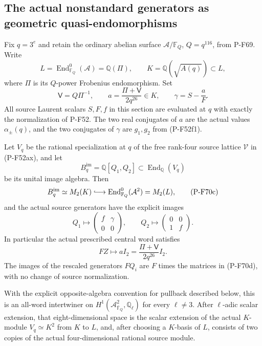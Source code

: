 \subsection{The actual nonstandard generators as geometric quasi-endomorphisms}

\begin{proposition}
\label{prop:nonstandardcorrespondence}
Fix $q=3^e$ and retain the ordinary abelian surface
$\mathcal A/\mathbb F_Q$, $Q=q^{116}$, from P-F69.
Write
\[
 L=\operatorname{End}^0_{\mathbb F_Q}(\mathcal A)
      =\mathbb Q(\Pi),\qquad
 K=\mathbb Q(\sqrt{A(q)})\subset L,
\]
where $\Pi$ is its $Q$-power Frobenius endomorphism.
Set
\[
 \mathsf V=Q\Pi^{-1},\qquad
 a=\frac{\Pi+\mathsf V}{2q^{26}}\in K,\qquad
 \gamma=S-\frac aF.                                           \tag{P-F70a}
\]
All source Laurent scalars $S,F,f$ in this section are evaluated
at $q$ with exactly the normalization of P-F52.
The two real conjugates of $a$ are the actual values
$\alpha_\pm(q)$, and the two conjugates of $\gamma$ are
$g_1,g_2$ from (P-F52f1).

Let $V_q$ be the rational specialization at $q$ of the free
rank-four source lattice $\mathcal V$ in (P-F52ax), and let
\[
 B_q^{\mathrm{im}}=\mathbb Q[Q_1,Q_2]
                       \subset\operatorname{End}_{\mathbb Q}(V_q)
                                                               \tag{P-F70b}
\]
be its unital image algebra.  Then
\[
 B_q^{\mathrm{im}}\simeq M_2(K)
       \lhook\joinrel\longrightarrow
       \operatorname{End}^0_{\mathbb F_Q}(\mathcal A^2)=M_2(L),
                                                               \tag{P-F70c}
\]
and the actual source generators have the explicit images
\[
 Q_1\longmapsto
       \begin{pmatrix}f&\gamma\\0&0\end{pmatrix},\qquad
 Q_2\longmapsto
       \begin{pmatrix}0&0\\1&f\end{pmatrix}.                    \tag{P-F70d}
\]
In particular the actual prescribed central word satisfies
\[
                  FZ\longmapsto a I_2
                  =\frac{\Pi+\mathsf V}{2q^{26}} I_2.          \tag{P-F70e}
\]
The images of the rescaled generators $FQ_i$ are $F$ times
the matrices in (P-F70d), with no change of source normalization.

With the explicit opposite-algebra convention for pullback
described below, this is an all-word intertwiner on
$H^1(\mathcal A^2_{\overline{\mathbb F}_Q},\mathbb Q_\ell)$
for every $\ell\ne3$.  After $\ell$-adic scalar extension,
that eight-dimensional space is the
scalar extension of the actual $K$-module $V_q\simeq K^2$
from $K$ to $L$, and, after choosing a $K$-basis of $L$,
consists of two copies of the actual four-dimensional
rational source module.


\end{proposition}
